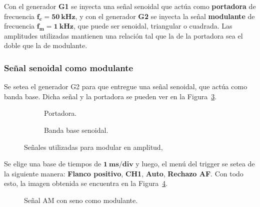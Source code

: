     Con el generador \textbf{G1} se inyecta una señal senoidal que actúa como \textbf{portadora} de frecuencia 
    $\mathbf{f_c=50~kHz}$, y con el generador \textbf{G2} se inyecta la señal \textbf{modulante} de frecuencia
    $\mathbf{f_m=1~kHz}$, que puede ser senoidal, triangular o cuadrada. Las amplitudes utilizadas mantienen 
    una relación tal que la de la portadora sea el doble que la de modulante.

    \subsubsection{Señal senoidal como modulante}
      Se setea el generador G2 para que entregue una señal senoidal, que actúa como banda base. Dicha señal
      y la portadora se pueden ver en la Figura~\ref{fig:SeñalesParaAM1}.
      
      \begin{figure}[H]
        \centering
        \begin{subfigure}[H]{0.48\textwidth}
          \caption{Portadora.}
          \label{fig:PortadoraEnTiempo}
        \end{subfigure}
        \hfill 
        \begin{subfigure}[H]{0.48\textwidth}
          \caption{Banda base senoidal.}
          \label{fig:SenoModulanteEnTiempo}
        \end{subfigure}
      
        \caption{Señales utilizadas para modular en amplitud,}
        \label{fig:SeñalesParaAM1}
      \end{figure}
        
      
      Se elige una base de tiempos de $\mathbf{1~ms/div}$ y luego, el menú del trigger se setea de la siguiente manera:
      \textbf{Flanco positivo}, \textbf{CH1}, \textbf{Auto}, \textbf{Rechazo AF}. Con
      todo esto, la imagen obtenida se encuentra en la Figura~\ref{fig:SeñalAM1EnTiempo}.
      
      \begin{figure}[H]
        \centering
        \caption{Señal AM con seno como modulante.}
        \label{fig:SeñalAM1EnTiempo}
      \end{figure}

